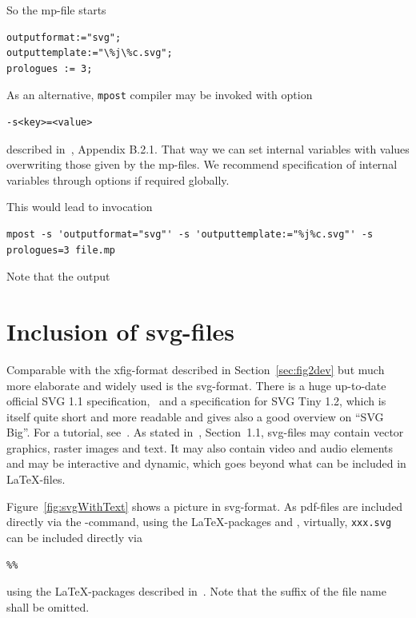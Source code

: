 \documentclass[12pt]{book}
\newcommand{\gls}[1]{#1}
\begin{document}
So the mp-file starts 
%
\lstset{language=metapost, basicstyle=\normalsize}
\begin{lstlisting}
outputformat:="svg";
outputtemplate:="\%j\%c.svg";
prologues := 3;
\end{lstlisting}

As an alternative, \texttt{mpost} compiler may be invoked with option 
%
\begin{verbatim}
-s<key>=<value>
\end{verbatim}
%
described in~\cite{MPost}, Appendix B.2.1. 
That way we can set internal variables with values 
overwriting those given by the mp-files. 
We recommend specification of internal variables through options 
if required globally. 

This would lead to invocation 
%
\begin{Verbatim}[fontsize=\scriptsize]
mpost -s 'outputformat="svg"' -s 'outputtemplate:="%j%c.svg"' -s prologues=3 file.mp
\end{Verbatim}

Note that the output 

\section{Inclusion of svg-files}\label{sec:picSvg}

Comparable with the xfig-format described in Section~\ref{sec:fig2dev} 
but much more elaborate and widely used is the \gls{svg}-format. 
There is a huge up-to-date official SVG 1.1 specification,~\cite{Svg11} 
and a specification for SVG Tiny 1.2, 
\cite{Svg12Tiny} which is itself quite short and more readable 
and gives also a good overview on ``SVG Big''. 
For a tutorial, see~\cite{SvgTut}. 
As stated in~\cite{Svg12Tiny}, Section~1.1, 
svg-files may contain vector graphics, raster images and text. 
It may also contain video and audio elements 
and may be interactive and dynamic, 
which goes beyond what can be included in \LaTeX-files. 

Figure~\ref{fig:svgWithText} shows a picture in \gls{svg}-format. 
As pdf-files are included directly 
via the -command, 
using the \LaTeX-packages  and , 
virtually, 
\texttt{xxx.svg} can be included directly via 
\begin{verbatim}
%%
\end{verbatim}
%
using the \LaTeX-packages  described in~\cite{SvgP}. 
Note that the suffix of the file name shall be omitted. 
\end{document}

